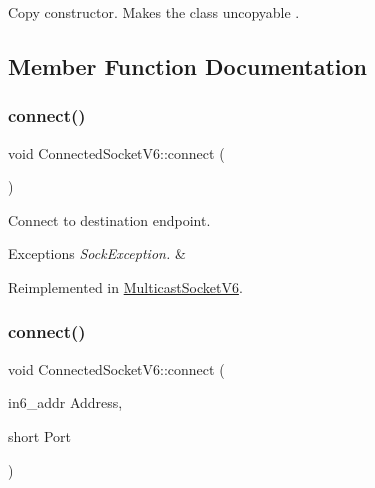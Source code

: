 Copy constructor. Makes the class uncopyable . 

\subsection{Member Function Documentation}
\mbox{\label{classConnectedSocketV6_ad08bcbb9f35ac5c5693e352d1bbc5460}} 
\subsubsection{\texorpdfstring{connect()}{connect()}\hspace{0.1cm}{\footnotesize\ttfamily [1/4]}}
{\footnotesize\ttfamily void Connected\+Socket\+V6\+::connect (\begin{DoxyParamCaption}{ }\end{DoxyParamCaption})\hspace{0.3cm}{\ttfamily [virtual]}}

Connect to destination endpoint. 
\begin{DoxyExceptions}{Exceptions}
{\em Sock\+Exception.} & \\
\hline
\end{DoxyExceptions}


Reimplemented in \hyperlink{classMulticastSocketV6_a81b62a13aff687c5b94b8f8a946c58ed}{Multicast\+Socket\+V6}.

\mbox{\label{classConnectedSocketV6_adfdf319dc49b3ff8cb2507178dfeda3f}} 
\subsubsection{\texorpdfstring{connect()}{connect()}\hspace{0.1cm}{\footnotesize\ttfamily [2/4]}}
{\footnotesize\ttfamily void Connected\+Socket\+V6\+::connect (\begin{DoxyParamCaption}\item[{in6\+\_\+addr}]{Address,  }\item[{short}]{Port }\end{DoxyParamCaption})\hspace{0.3cm}{\ttfamily [inline]}}

